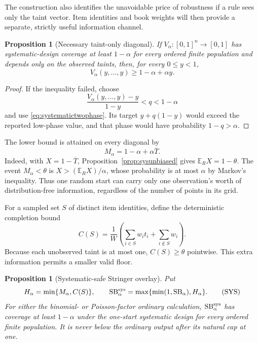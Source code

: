 \documentclass[11pt]{article}
\newtheorem{proposition}[theorem]{Proposition}
\theoremstyle{definition}
\newcommand{\SB}{\mathrm{SB}}
\newcommand{\E}{\mathbb{E}}
\begin{document}
The construction also identifies the unavoidable price of robustness if a
rule sees only the taint vector. Item identities and book weights will then
provide a separate, strictly useful information channel.

\begin{proposition}[Necessary taint-only diagonal]
\label{prop:systematicfloor}
If $V_\alpha:[0,1]^n\to[0,1]$ has systematic-design coverage at least
$1-\alpha$ for every ordered finite population and depends only on the
observed taints, then, for every $0\le y<1$,
\[
 V_\alpha(y,\ldots,y)\ge1-\alpha+\alpha y.
\]
\end{proposition}

\begin{proof}
If the inequality failed, choose
\[
 \frac{V_\alpha(y,\ldots,y)-y}{1-y}<q<1-\alpha
\]
and use \eqref{eq:systematictwophase}. Its target
$y+q(1-y)$ would exceed the reported low-phase value, and that phase would
have probability $1-q>\alpha$.
\end{proof}

The lower bound is attained on every diagonal by
\begin{equation}\label{eq:systematicmarkov}
 M_\alpha=1-\alpha+\alpha\overline T.
\end{equation}
Indeed, with $X=1-\overline T$, Proposition~\ref{prop:sysunbiased} gives
$\E_R X=1-\theta$. The event $M_\alpha<\theta$ is
$X>(\E_R X)/\alpha$, whose probability is at most $\alpha$ by Markov's
inequality. Thus one random start can carry only one observation's worth of
distribution-free information, regardless of the number of points in its
grid.

For a sampled set $S$ of distinct item identities, define the deterministic
completion bound
\[
 C(S)=\frac1W\left(\sum_{i\in S}w_it_i+\sum_{i\notin S}w_i\right).
\]
Because each unobserved taint is at most one, $C(S)\ge\theta$ pointwise.
This extra information permits a smaller valid floor.

\begin{proposition}[Systematic-safe Stringer overlay]
\label{prop:systematicsafeguard}
Put
\begin{equation*}
 H_\alpha=\min\{M_\alpha,C(S)\},
 \qquad
 \SB_\alpha^{\rm sys}
 =\max\{\min(1,\SB_\alpha),H_\alpha\}.
\tag{SYS}\label{eq:systematicsafe}
\end{equation*}
For either the binomial- or Poisson-factor ordinary calculation,
$\SB_\alpha^{\rm sys}$ has coverage at least $1-\alpha$ under the one-start
systematic design for every ordered finite population. It is never below
the ordinary output after its natural cap at one.
\end{proposition}
\end{document}
